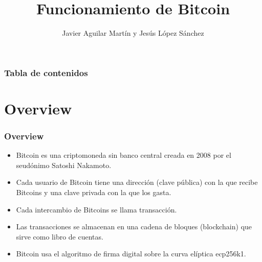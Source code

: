 \documentclass{beamer}
\title{Funcionamiento de Bitcoin}
\author{Javier Aguilar Martín y Jesús López Sánchez}
\institute{Universidad de Sevilla}
\date{}
\theoremstyle{definition}
\begin{document}
\frame{\titlepage}
%
%
% 
% 
% 

% 



\newcommand{\seti}{\setcounter{saveenumi}{\value{enumi}}}
\newcommand{\conti}{\setcounter{enumi}{\value{saveenumi}}}

\begin{frame}
\frametitle{Tabla de contenidos}
\tableofcontents
\end{frame}


\section{Overview}
\begin{frame}
	\frametitle{Overview}
	\begin{itemize}
		\item<1-> Bitcoin es una criptomoneda sin banco central creada en 2008 por el seudónimo Satoshi Nakamoto.
		\item<2-> Cada usuario de Bitcoin tiene una dirección (clave pública) con la que recibe Bitcoins y una clave privada con la que los gasta.
		\item<3-> Cada intercambio de Bitcoins se llama transacción.
		\item<4-> Las transacciones se almacenan en una cadena de bloques (blockchain) que sirve como libro de cuentas.
		\item<5-> Bitcoin usa el algoritmo de firma digital sobre la curva elíptica ecp256k1.
	\end{itemize}
	
	
	
	
	
	
	
\end{frame}
\end{document}
